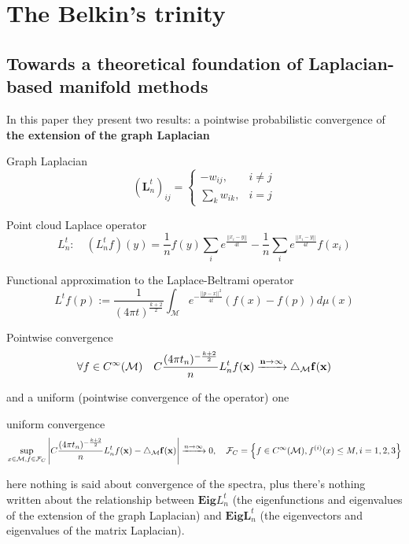 
\section{The Belkin's trinity}
\subsection{Towards a theoretical foundation of Laplacian-based manifold methods}

In this paper they present two results: a pointwise probabilistic convergence of \textbf{the extension of the graph Laplacian} 
\begin{definition}{Graph Laplacian}
	$$ \left(\mathbf L_n^t\right)_{ij}=\begin{cases}
	-w_{ij}, & i\neq j\\
	\sum_{k}w_{ik}, & i=j
	\end{cases}$$
\end{definition}
\begin{definition}{Point cloud Laplace operator}
	$$L_n^t:\quad(L_n^tf)(y) = \frac{1}{n}f(y)\sum_i e^\frac{||x_i-y||}{4t}-\frac{1}{n}\sum_ie^\frac{||x_i-y||}{4t}f(x_i)$$
\end{definition}
\begin{definition}{Functional approximation to the Laplace-Beltrami operator} \label{eq:L^t}
	$$L^tf(p) :=  \frac{1}{ (4\pi t)^{\frac{k+2}{2}}} \int_\mathcal Me^{-\frac{||p-x||^2}{4t}}\left(f(x)-f(p)\right)d\mu(x)$$
\end{definition}

\begin{theorem}{Pointwise convergence}
	$$\forall f \in C^\infty(\mathcal M)\quad  C\frac{(4\pi t_n)^{-\frac{k+2}{2}}}{n} L_n^t f(\bf x) \xrightarrow{n\to\infty}\triangle_\mathcal M f(\bf x)$$
\end{theorem}


and a uniform (pointwise convergence of the operator) one
\begin{theorem}{uniform convergence}
	$$\sup_{x\in\mathcal M, f\in \mathcal F_C}\left| C\frac{(4\pi t_n)^{-\frac{k+2}{2}}}{n} L_n^t f(\bf x) - \triangle_\mathcal M f(\bf x) \right|\xrightarrow{n\to\infty}0
	, \quad \mathcal F_C = \left\{f\in C^\infty(\mathcal M), f^{(i)}(x)\leq M, i=1,2,3\right\}$$
\end{theorem}


here nothing is said about convergence of the spectra, plus there's nothing written about the relationship between $\mathbf{Eig} L_n^t$ (the eigenfunctions and eigenvalues of the extension of the graph Laplacian) and $\mathbf {Eig} \mathbf {L}_n^t$ (the eigenvectors and eigenvalues of the matrix Laplacian).

